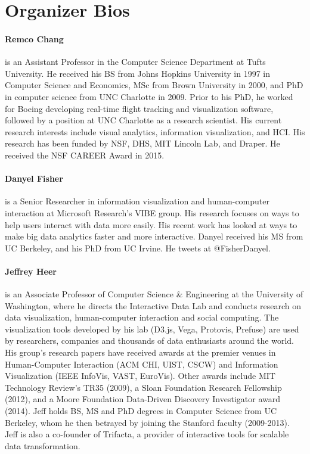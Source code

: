 \documentclass[journal]{vgtc}                %
\begin{document}
\section{Organizer Bios}

\paragraph*{Remco Chang} is an Assistant Professor in the Computer Science Department at Tufts University. He received his BS from Johns Hopkins University in 1997 in Computer Science and Economics, MSc from Brown University in 2000, and PhD in computer science from UNC Charlotte in 2009. Prior to his PhD, he worked for Boeing developing real-time flight tracking and visualization software, followed by a position at UNC Charlotte as a research scientist. His current research interests include visual analytics, information visualization, and HCI. His research has been funded by NSF, DHS, MIT Lincoln Lab, and Draper. He received the NSF CAREER Award in 2015.

\paragraph*{Danyel Fisher} is a Senior Researcher in information visualization and human-computer interaction at Microsoft Research's VIBE group. His research focuses on ways to help users interact with data more easily. His recent work has looked at ways to make big data analytics faster and more interactive. Danyel received his MS from UC Berkeley, and his PhD from UC Irvine. He tweets at @FisherDanyel.

\paragraph*{Jeffrey Heer} is an Associate Professor of Computer Science \& Engineering at the University of Washington, where he directs the Interactive Data Lab and conducts research on data visualization, human-computer interaction and social computing. The visualization tools developed by his lab (D3.js, Vega, Protovis, Prefuse) are used by researchers, companies and thousands of data enthusiasts around the world. His group's research papers have received awards at the premier venues in Human-Computer Interaction (ACM CHI, UIST, CSCW) and Information Visualization (IEEE InfoVis, VAST, EuroVis). Other awards include MIT Technology Review's TR35 (2009), a Sloan Foundation Research Fellowship (2012), and a Moore Foundation Data-Driven Discovery Investigator award (2014). Jeff holds BS, MS and PhD degrees in Computer Science from UC Berkeley, whom he then betrayed by joining the Stanford faculty (2009-2013). Jeff is also a co-founder of Trifacta, a provider of interactive tools for scalable data transformation.
\end{document}
